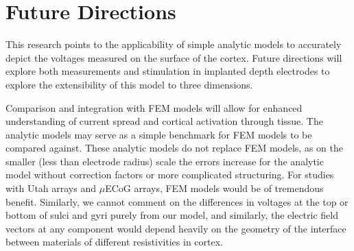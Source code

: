 %
%
%
%

\section{Future Directions}

This research points to the applicability of simple analytic models to accurately depict the voltages measured on the surface of the cortex. Future directions will explore both measurements and stimulation in implanted depth electrodes to explore the extensibility of this model to three dimensions. 

Comparison and integration with FEM models will allow for enhanced understanding of current spread and cortical activation through tissue. The analytic models may serve as a simple benchmark for FEM models to be compared against. These analytic models do not replace FEM models, as on the smaller (less than electrode radius) scale the errors increase for the analytic model without correction factors or more complicated structuring. For studies with Utah arrays and $\mu$ECoG arrays, FEM models would be of tremendous benefit. Similarly, we cannot comment on the differences in voltages at the top or bottom of sulci and gyri purely from our model, and similarly, the electric field vectors at any component would depend heavily on the geometry of the interface between materials of different resistivities in cortex. 

